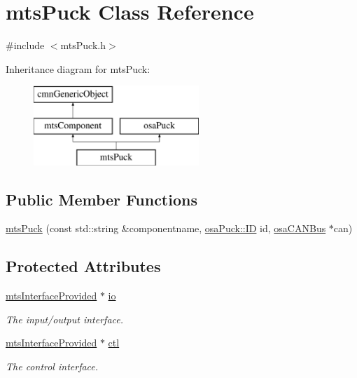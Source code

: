\hypertarget{classmts_puck}{}\section{mts\+Puck Class Reference}
\label{classmts_puck}


{\ttfamily \#include $<$mts\+Puck.\+h$>$}

Inheritance diagram for mts\+Puck\+:\begin{figure}[H]
\begin{center}
\leavevmode
\includegraphics[height=3.000000cm]{de/dae/classmts_puck}
\end{center}
\end{figure}
\subsection*{Public Member Functions}
\begin{DoxyCompactItemize}
\item 
\hyperlink{classmts_puck_a2b90fcc8e3d4f0d7559e90f51fcd1234}{mts\+Puck} (const std\+::string \&componentname, \hyperlink{classosa_puck_aa484456bae759574accdc76fe68b4685}{osa\+Puck\+::\+I\+D} id, \hyperlink{classosa_c_a_n_bus}{osa\+C\+A\+N\+Bus} $\ast$can)
\end{DoxyCompactItemize}
\subsection*{Protected Attributes}
\begin{DoxyCompactItemize}
\item 
\hyperlink{classmts_interface_provided}{mts\+Interface\+Provided} $\ast$ \hyperlink{classmts_puck_adea7df2434dcfa2dc1c56fd2e4d2d633}{io}
\begin{DoxyCompactList}\small\item\em The input/output interface. \end{DoxyCompactList}\item 
\hyperlink{classmts_interface_provided}{mts\+Interface\+Provided} $\ast$ \hyperlink{classmts_puck_a65fcf71bc74ff8496c5c170b0b4cf1aa}{ctl}
\begin{DoxyCompactList}\small\item\em The control interface. \end{DoxyCompactList}\end{DoxyCompactItemize}
